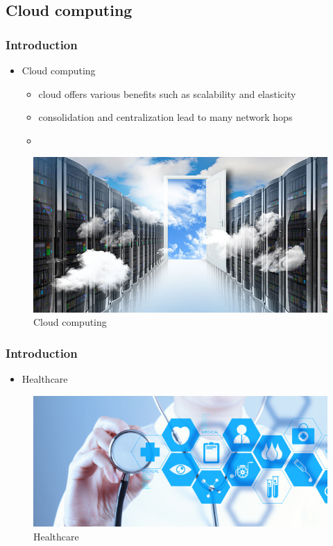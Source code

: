\documentclass{beamer}
\begin{document}
\subsection{Cloud computing}
\begin{frame}
\frametitle{Introduction}
\begin{itemize}
	\item Cloud computing
	\begin{itemize}
		\item \color{blue} {cloud offers various benefits such as
			scalability and elasticity}
		\item {consolidation and centralization
			lead to many network hops}
		\item \color{red}{results in high latencies and high bandwidth consumption}
		
	\end{itemize}
\end{itemize}
\begin{figure}
	\includegraphics[scale=0.35]{cloud-computing-2}
	\caption{Cloud computing}
	\label{fig:cloud-computing-2}
\end{figure}
\end{frame}
\begin{frame}
\frametitle{Introduction}
\begin{itemize}
	\item Healthcare
\end{itemize}	
\begin{figure}
	\centering
	\includegraphics[width=0.7\linewidth]{healthcare}
	\caption{Healthcare}
	\label{fig:healthcare}
\end{figure}
\end{frame}
\end{document}
